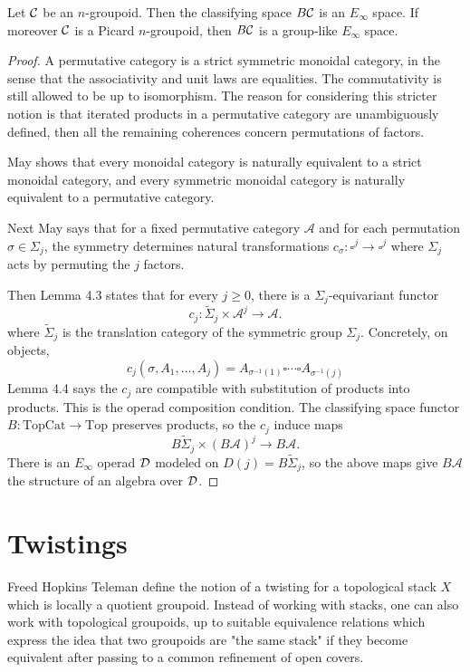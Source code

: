 \documentclass[12pt]{article}
\begin{document}
\begin{theorem}
    Let ${\mathcal{C}}$ be an $n$-groupoid. Then the classifying space $B{\mathcal{C}}$ is an $E_\infty$ space. If moreover ${\mathcal{C}}$ is a Picard $n$-groupoid, then $B{\mathcal{C}}$ is a group-like $E_\infty$ space.
\end{theorem}
\begin{proof}
    A permutative category is a strict symmetric monoidal category, in the sense that the associativity and unit laws are equalities. The commutativity is still allowed to be up to isomorphism. The reason for considering this stricter notion is that iterated products in a permutative category are unambiguously defined, then all the remaining coherences concern permutations of factors.

    May shows that every monoidal category is naturally equivalent to a strict monoidal category, and every symmetric monoidal category is naturally equivalent to a permutative category.

    Next May says that for a fixed permutative category $\mathcal A$ and for each permutation $\sigma\in \Sigma_j$, the symmetry determines natural transformations $c_\sigma:\square^j\to \square^j$ where $\Sigma_j$ acts by permuting the $j$ factors.

    Then Lemma 4.3 states that for every $j\geq 0$, there is a $\Sigma_j$-equivariant functor
    \[
        c_j:\widetilde{\Sigma}_j\times \mathcal A^j\to \mathcal A.
    \]
    where $\widetilde{\Sigma}_j$ is the translation category of the symmetric group $\Sigma_j$. Concretely, on objects,
    \[c_j(\sigma,A_1,\dots,A_j)
        =
        A_{\sigma^{-1}(1)}\square\cdots\square A_{\sigma^{-1}(j)}\]
    Lemma 4.4 says the $c_j$ are compatible with substitution of products into products. This is the operad composition condition. The classifying space functor $B:\mathrm{TopCat}\to \mathrm{Top}$ preserves products, so the $c_j$ induce maps
    \[B\widetilde{\Sigma}_j\times (B\mathcal A)^j\to B\mathcal A.\]
    There is an $E_\infty$ operad ${\mathcal{D}}$ modeled on $D(j)  = B\widetilde{\Sigma}_j$, so the above maps give $B\mathcal A$ the structure of an algebra over ${\mathcal{D}}$.
\end{proof}

\section{Twistings}
Freed Hopkins Teleman define the notion of a twisting for a topological stack $X$ which is locally a quotient groupoid. Instead of working with stacks, one can also work with topological groupoids, up to suitable equivalence relations which express the idea that two groupoids are "the same stack" if they become equivalent after passing to a common refinement of open covers.
\end{document}
